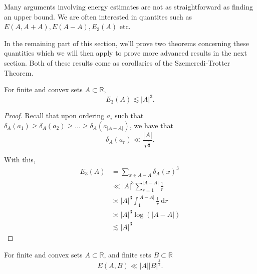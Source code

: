 \documentclass[12pt,reqno]{amsart}
\begin{document}
Many arguments involving energy estimates are not as straightforward
as finding an upper bound. We are often interested in quantites such as 
\(E(A,A + A), E(A - A), E_{3} (A)\) etc.

In the remaining part of this section, we'll prove two theorems concerning these quantities
which we will then apply to prove more advanced results in the next section. Both of these
results come as corollaries of the Szemeredi-Trotter Theorem.

\begin{theorem}
For finite and convex sets \(A \subset \mathbb{R} \),
\[
    E_{3} (A) \lesssim  \left\lvert A \right\rvert ^{ 3}
.\]
\end{theorem}

\begin{proof}
Recall that upon ordering \(a_{i} \) such that \(\delta_A(a_1) \geq \delta_A(a_2) \geq \dots \geq \delta_{A} (a_{\left\lvert A-A \right\rvert } )\),
we have that
\[
    \delta_{A} (a_{r} ) \ll \frac{\left\lvert A \right\rvert }{r^{\frac{1}{3} }}
.\]

With this,
\begin{align*}
E_3(A) & = \sum _{x \in A-A} \delta_{A} (x)^{3} \\
& \ll \left\lvert A \right\rvert ^{3} \sum_{r=1}^{\left\lvert A-A \right\rvert } \frac{1}{r}\\
& \asymp \left\lvert A \right\rvert ^{3} \int_{1}^{\left\lvert A-A \right\rvert } \frac{1}{r}  ~\mathrm{d} r \\
& \asymp  \left\lvert A \right\rvert ^{3} \log \left( \left\lvert A-A \right\rvert  \right) \\
& \lesssim  \left\lvert A \right\rvert ^{3}
\end{align*}
\end{proof}

\begin{theorem} \label{thm:szt-energy-convex-and-arbitrary}
For finite and convex sets \(A \subset \mathbb{R} \), and finite sets \(B \subset \mathbb{R} \)
\[
    E(A,B) \ll \left\lvert A \right\rvert \left\lvert B \right\rvert ^{\frac{3}{2} }
.\]
\end{theorem}
\end{document}
